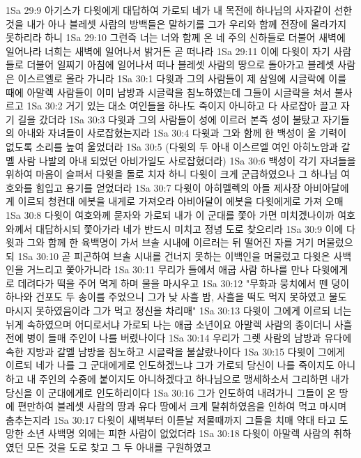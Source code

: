 1Sa 29:9  아기스가 다윗에게 대답하여 가로되 네가 내 목전에 하나님의 사자같이 선한 것을 내가 아나 블레셋 사람의 방백들은 말하기를 그가 우리와 함께 전장에 올라가지 못하리라 하니
1Sa 29:10  그런즉 너는 너와 함께 온 네 주의 신하들로 더불어 새벽에 일어나라 너희는 새벽에 일어나서 밝거든 곧 떠나라
1Sa 29:11  이에 다윗이 자기 사람들로 더불어 일찌기 아침에 일어나서 떠나 블레셋 사람의 땅으로 돌아가고 블레셋 사람은 이스르엘로 올라 가니라
1Sa 30:1  다윗과 그의 사람들이 제 삼일에 시글락에 이를 때에 아말렉 사람들이 이미 남방과 시글락을 침노하였는데 그들이 시글락을 쳐서 불사르고
1Sa 30:2  거기 있는 대소 여인들을 하나도 죽이지 아니하고 다 사로잡아 끌고 자기 길을 갔더라
1Sa 30:3  다윗과 그의 사람들이 성에 이르러 본즉 성이 불탔고 자기들의 아내와 자녀들이 사로잡혔는지라
1Sa 30:4  다윗과 그와 함께 한 백성이 울 기력이 없도록 소리를 높여 울었더라
1Sa 30:5  (다윗의 두 아내 이스르엘 여인 아히노암과 갈멜 사람 나발의 아내 되었던 아비가일도 사로잡혔더라)
1Sa 30:6  백성이 각기 자녀들을 위하여 마음이 슬퍼서 다윗을 돌로 치자 하니 다윗이 크게 군급하였으나 그 하나님 여호와를 힘입고 용기를 얻었더라
1Sa 30:7  다윗이 아히멜렉의 아들 제사장 아비아달에게 이르되 청컨대 에봇을 내게로 가져오라 아비아달이 에봇을 다윗에게로 가져 오매
1Sa 30:8  다윗이 여호와께 묻자와 가로되 내가 이 군대를 쫓아 가면 미치겠나이까 여호와께서 대답하시되 쫓아가라 네가 반드시 미치고 정녕 도로 찾으리라
1Sa 30:9  이에 다윗과 그와 함께 한 육백명이 가서 브솔 시내에 이르러는 뒤 떨어진 자를 거기 머물렀으되
1Sa 30:10  곧 피곤하여 브솔 시내를 건너지 못하는 이백인을 머물렀고 다윗은 사백인을 거느리고 쫓아가니라
1Sa 30:11  무리가 들에서 애굽 사람 하나를 만나 다윗에게로 데려다가 떡을 주어 멱게 하며 물을 마시우고
1Sa 30:12  "무화과 뭉치에서 뗀 덩이 하나와 건포도 두 송이를 주었으니 그가 낮 사흘 밤, 사흘을 떡도 먹지 못하였고 물도 마시지 못하였음이라 그가 먹고 정신을 차리매"
1Sa 30:13  다윗이 그에게 이르되 너는 뉘게 속하였으며 어디로서냐 가로되 나는 애굽 소년이요 아말렉 사람의 종이더니 사흘 전에 병이 들매 주인이 나를 버렸나이다
1Sa 30:14  우리가 그렛 사람의 남방과 유다에 속한 지방과 갈멜 남방을 침노하고 시글락을 불살랐나이다
1Sa 30:15  다윗이 그에게 이르되 네가 나를 그 군대에게로 인도하겠느냐 그가 가로되 당신이 나를 죽이지도 아니하고 내 주인의 수중에 붙이지도 아니하겠다고 하나님으로 맹세하소서 그리하면 내가 당신을 이 군대에게로 인도하리이다
1Sa 30:16  그가 인도하여 내려가니 그들이 온 땅에 편만하여 블레셋 사람의 땅과 유다 땅에서 크게 탈취하였음을 인하여 먹고 마시며 춤추는지라
1Sa 30:17  다윗이 새벽부터 이튿날 저물때까지 그들을 치매 약대 타고 도망한 소년 사백명 외에는 피한 사람이 없었더라
1Sa 30:18  다윗이 아말렉 사람의 취하였던 모든 것을 도로 찾고 그 두 아내를 구원하였고

